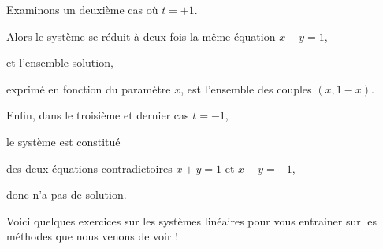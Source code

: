 \diapo

Examinons un deuxième cas où $t=+1$. 

\change
Alors le système se réduit à deux fois la même équation $x+y=1$, 

\change
et l'ensemble solution, 

\change
exprimé en fonction du paramètre $x$, est l'ensemble des couples $(x,1-x)$.

\change

Enfin, dans le troisième et dernier cas $t=-1$, 

\change
le système est constitué 

\change
des deux équations contradictoires $x+y=1$ et $x+y=-1$, 

\change
donc n'a pas de solution.

\diapo

Voici quelques exercices sur les systèmes linéaires pour vous entrainer sur les méthodes que nous venons de voir !



